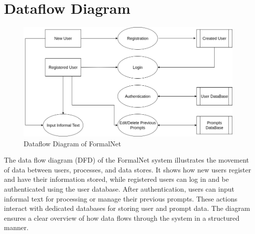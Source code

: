 \section{Dataflow Diagram}
\begin{figure}[H]
  \centering
  \includegraphics[width=1\textwidth]{images/dataflowdiagram.png}
  \caption{Dataflow Diagram of FormalNet}
  \label{fig:df}
\end{figure}
The data flow diagram (DFD) of the FormalNet system illustrates the movement of data between users, processes, and data stores. It shows how new users register and have their information stored, while registered users can log in and be authenticated using the user database. After authentication, users can input informal text for processing or manage their previous prompts. These actions interact with dedicated databases for storing user and prompt data. The diagram ensures a clear overview of how data flows through the system in a structured manner.


